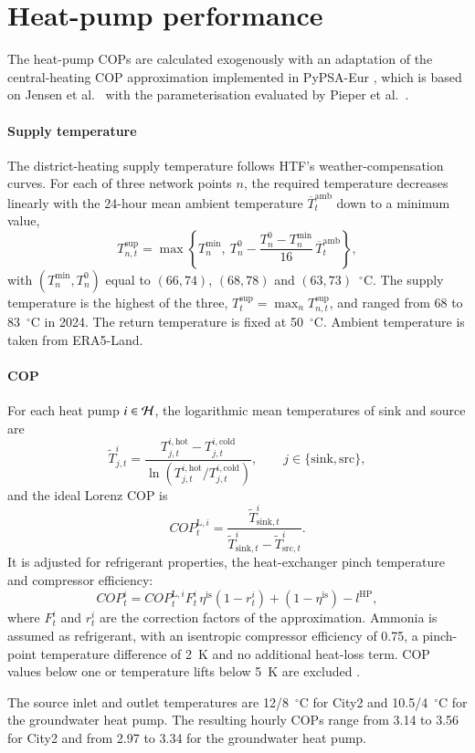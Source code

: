\section{Heat-pump performance}
\label{app:cop}

The heat-pump COPs are calculated exogenously with an adaptation of the central-heating COP approximation implemented in PyPSA-Eur \cite{pypsaeur2025}, which is based on Jensen et al.\ \cite{jensen2018cop} with the parameterisation evaluated by Pieper et al.\ \cite{pieper2020cop}.

\paragraph{Supply temperature}
The district-heating supply temperature follows HTF's weather-compensation curves. For each of three network points $n$, the required temperature decreases linearly with the 24-hour mean ambient temperature $\overline{T}^{\mathrm{amb}}_t$ down to a minimum value,
\begin{equation}
    T^{\mathrm{sup}}_{n,t} = \max\left\{T^{\min}_n,\ T^{0}_n - \frac{T^{0}_n - T^{\min}_n}{16}\,\overline{T}^{\mathrm{amb}}_t\right\},
\end{equation}
with $(T^{\min}_n, T^{0}_n)$ equal to $(66, 74)$, $(68, 78)$ and $(63, 73)$~$^\circ$C. The supply temperature is the highest of the three, $T^{\mathrm{sup}}_t=\max_n T^{\mathrm{sup}}_{n,t}$, and ranged from 68 to 83~$^\circ$C in 2024. The return temperature is fixed at 50~$^\circ$C. Ambient temperature is taken from ERA5-Land.

\paragraph{COP}
For each heat pump $i\in\mathcal{H}$, the logarithmic mean temperatures of sink and source are
\begin{equation}
    \widetilde{T}^{i}_{j,t}
    = \frac{T^{i,\mathrm{hot}}_{j,t} - T^{i,\mathrm{cold}}_{j,t}}
           {\ln\left(T^{i,\mathrm{hot}}_{j,t}/T^{i,\mathrm{cold}}_{j,t}\right)},
    \qquad j\in\{\mathrm{sink},\mathrm{src}\},
\end{equation}
and the ideal Lorenz COP is
\begin{equation}
    COP^{\mathrm{L},i}_{t} = \frac{\widetilde{T}^{i}_{\mathrm{sink},t}}{\widetilde{T}^{i}_{\mathrm{sink},t} - \widetilde{T}^{i}_{\mathrm{src},t}}.
\end{equation}
It is adjusted for refrigerant properties, the heat-exchanger pinch temperature and compressor efficiency:
\begin{equation}
    COP^{i}_{t} = COP^{\mathrm{L},i}_{t} F^{i}_{t}\,\eta^{\mathrm{is}}\left(1-r^{i}_{t}\right) + \left(1-\eta^{\mathrm{is}}\right) - l^{\mathrm{HP}},
\end{equation}
where $F^{i}_{t}$ and $r^{i}_{t}$ are the correction factors of the approximation. Ammonia is assumed as refrigerant, with an isentropic compressor efficiency of 0.75, a pinch-point temperature difference of 2~K and no additional heat-loss term. COP values below one or temperature lifts below 5~K are excluded \cite{zajacs2020lowtemperature}.

The source inlet and outlet temperatures are 12/8~$^\circ$C for City2 and 10.5/4~$^\circ$C for the groundwater heat pump. The resulting hourly COPs range from 3.14 to 3.56 for City2 and from 2.97 to 3.34 for the groundwater heat pump.
